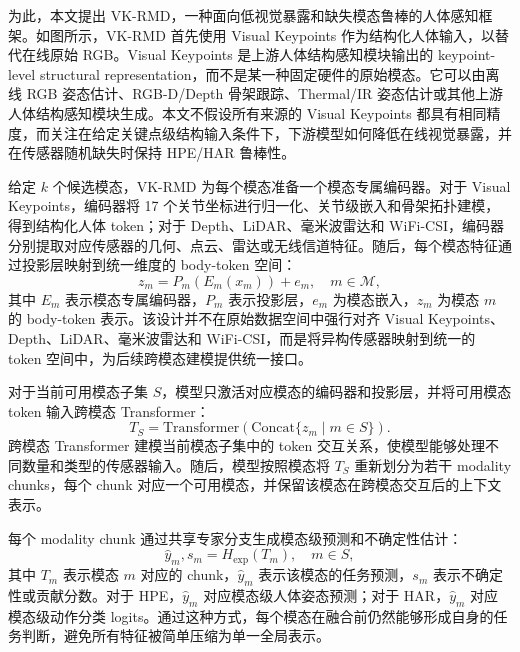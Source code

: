 \documentclass[journal]{IEEEtran}
\begin{document}
为此，本文提出 VK-RMD，一种面向低视觉暴露和缺失模态鲁棒的人体感知框架。如图所示，VK-RMD 首先使用 Visual Keypoints 作为结构化人体输入，以替代在线原始 RGB。Visual Keypoints 是上游人体结构感知模块输出的 keypoint-level structural representation，而不是某一种固定硬件的原始模态。它可以由离线 RGB 姿态估计、RGB-D/Depth 骨架跟踪、Thermal/IR 姿态估计或其他上游人体结构感知模块生成。本文不假设所有来源的 Visual Keypoints 都具有相同精度，而关注在给定关键点级结构输入条件下，下游模型如何降低在线视觉暴露，并在传感器随机缺失时保持 HPE/HAR 鲁棒性。

给定 $k$ 个候选模态，VK-RMD 为每个模态准备一个模态专属编码器。对于 Visual Keypoints，编码器将 17 个关节坐标进行归一化、关节级嵌入和骨架拓扑建模，得到结构化人体 token；对于 Depth、LiDAR、毫米波雷达和 WiFi-CSI，编码器分别提取对应传感器的几何、点云、雷达或无线信道特征。随后，每个模态特征通过投影层映射到统一维度的 body-token 空间：
\begin{equation}
    z_m = P_m(E_m(x_m)) + e_m, \quad m \in \mathcal{M},
    \label{eq:body_token}
\end{equation}
其中 $E_m$ 表示模态专属编码器，$P_m$ 表示投影层，$e_m$ 为模态嵌入，$z_m$ 为模态 $m$ 的 body-token 表示。该设计并不在原始数据空间中强行对齐 Visual Keypoints、Depth、LiDAR、毫米波雷达和 WiFi-CSI，而是将异构传感器映射到统一的 token 空间中，为后续跨模态建模提供统一接口。

对于当前可用模态子集 $S$，模型只激活对应模态的编码器和投影层，并将可用模态 token 输入跨模态 Transformer：
\begin{equation}
    T_S = \mathrm{Transformer}
    \left(
    \mathrm{Concat}\{z_m \mid m \in S\}
    \right).
    \label{eq:subset_transformer}
\end{equation}
跨模态 Transformer 建模当前模态子集中的 token 交互关系，使模型能够处理不同数量和类型的传感器输入。随后，模型按照模态将 $T_S$ 重新划分为若干 modality chunks，每个 chunk 对应一个可用模态，并保留该模态在跨模态交互后的上下文表示。

每个 modality chunk 通过共享专家分支生成模态级预测和不确定性估计：
\begin{equation}
    \hat{y}_m, s_m = H_{\mathrm{exp}}(T_m), \quad m\in S,
    \label{eq:expert_prediction}
\end{equation}
其中 $T_m$ 表示模态 $m$ 对应的 chunk，$\hat{y}_m$ 表示该模态的任务预测，$s_m$ 表示不确定性或贡献分数。对于 HPE，$\hat{y}_m$ 对应模态级人体姿态预测；对于 HAR，$\hat{y}_m$ 对应模态级动作分类 logits。通过这种方式，每个模态在融合前仍然能够形成自身的任务判断，避免所有特征被简单压缩为单一全局表示。
\end{document}
